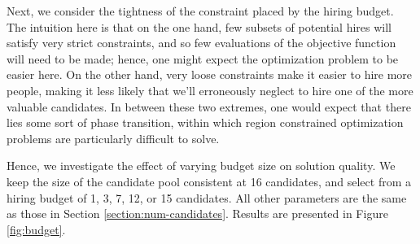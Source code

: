 Next, we consider the tightness of the constraint placed by the hiring budget.
The intuition here is that on the one hand, few subsets of potential hires will satisfy very strict constraints, and so few evaluations of the objective function will need to be made; hence, one might expect the optimization problem to be easier here.
On the other hand, very loose constraints make it easier to hire more people, making it less likely that we'll erroneously neglect to hire one of the more valuable candidates.
In between these two extremes, one would expect that there lies some sort of phase transition, within which region constrained optimization problems are particularly difficult to solve.

Hence, we investigate the effect of varying budget size on solution quality.
We keep the size of the candidate pool consistent at 16 candidates, and select from a hiring budget of 1, 3, 7, 12, or 15 candidates.
All other parameters are the same as those in Section \ref{section:num-candidates}.
Results are presented in Figure \ref{fig:budget}.